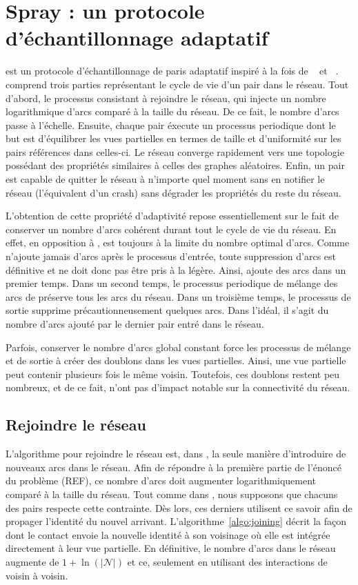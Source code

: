 
\section{Spray : un protocole d'échantillonnage adaptatif}

\SPRAY est un protocole d'échantillonnage de paris adaptatif inspiré à la fois
de \SCAMP~\cite{ganesh2003peer} et \CYCLON~\cite{voulgaris2005cyclon}. \SPRAY
comprend trois parties représentant le cycle de vie d'un pair dans le
réseau. Tout d'abord, le processus consistant à rejoindre le réseau, qui injecte
un nombre logarithmique d'arcs comparé à la taille du réseau. De ce fait, le
nombre d'arcs passe à l'échelle. Ensuite, chaque pair éxecute un processus
periodique dont le but est d'équilibrer les vues partielles en termes de taille
et d'uniformité sur les pairs références dans celles-ci. Le réseau converge
rapidement vers une topologie possédant des propriétés similaires à celles des
graphes aléatoires. Enfin, un pair est capable de quitter le réseau à n'importe
quel moment sans en notifier le réseau (l'équivalent d'un crash) sans dégrader
les propriétés du reste du réseau.

L'obtention de cette propriété d'adaptivité repose essentiellement sur le fait
de conserver un nombre d'arcs cohérent durant tout le cycle de vie du réseau.
En effet, en opposition à \CYCLON, \SPRAY est toujours à la limite du nombre
optimal d'arcs. Comme \SPRAY n'ajoute jamais d'arcs après le processus d'entrée,
toute suppression d'arcs est définitive et ne doit donc pas être pris à la
légère. Ainsi, \SPRAY ajoute des arcs dans un premier temps. Dans un second
temps, le processus periodique de mélange des arcs de \SPRAY préserve tous les
arcs du réseau.  Dans un troisième temps, le processus de sortie supprime
précautionneusement quelques arcs. Dans l'idéal, il s'agit du nombre d'arcs
ajouté par le dernier pair entré dans le réseau.

Parfois, conserver le nombre d'arcs global constant force les processus de
mélange et de sortie à créer des doublons dans les vues partielles. Ainsi, une
vue partielle peut contenir plusieurs fois le même voisin. Toutefois, ces
doublons restent peu nombreux, et de ce fait, n'ont pas d'impact notable sur la
connectivité du réseau.

\subsection{Rejoindre le réseau}

L'algorithme pour rejoindre le réseau est, dans \SPRAY, la seule manière
d'introduire de nouveaux arcs dans le réseau. Afin de répondre à la première
partie de l'énoncé du problème (REF), ce nombre d'arcs doit augmenter
logarithmiquement comparé à la taille du réseau. Tout comme dans \SCAMP, nous
supposons que chacuns des pairs respecte cette contrainte. Dès lors, ces
derniers utilisent ce savoir afin de propager l'identité du nouvel
arrivant. L'algorithme~\ref{algo:joining} décrit la façon dont le contact envoie
la nouvelle identité à son voisinage où elle est intégrée directement à leur vue
partielle. En définitive, le nombre d'arcs dans le réseau augmente de
$1+\ln(|\mathcal{N}|)$ et ce, seulement en utilisant des interactions de voisin
à voisin.

